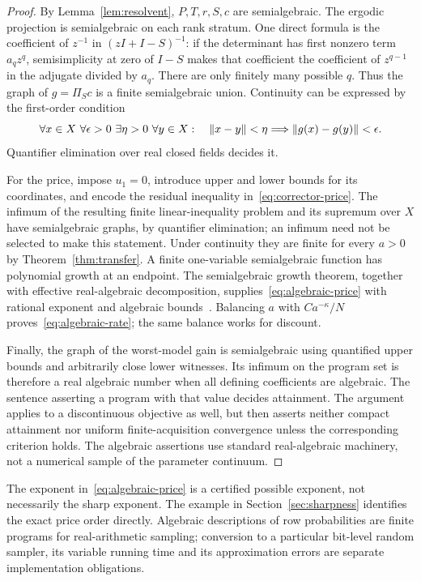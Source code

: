 \begin{proof}
By Lemma~\ref{lem:resolvent}, $P,T,r,S,c$ are semialgebraic. The ergodic projection is semialgebraic on each rank stratum. One direct formula is the coefficient of $z^{-1}$ in $(zI+I-S)^{-1}$: if the determinant has first nonzero term $a_qz^q$, semisimplicity at zero of $I-S$ makes that coefficient the coefficient of $z^{q-1}$ in the adjugate divided by $a_q$. There are only finitely many possible $q$. Thus the graph of $g=\Pi_Sc$ is a finite semialgebraic union. Continuity can be expressed by the first-order condition
\[
 \forall x\in X\ \forall\epsilon>0\ \exists\eta>0\
 \forall y\in X:\quad \norm{x-y}<\eta\Longrightarrow
 \norm{g(x)-g(y)}<\epsilon.
\]
Quantifier elimination over real closed fields decides it.

For the price, impose $u_1=0$, introduce upper and lower bounds for its coordinates, and encode the residual inequality in~\eqref{eq:corrector-price}. The infimum of the resulting finite linear-inequality problem and its supremum over $X$ have semialgebraic graphs, by quantifier elimination; an infimum need not be selected to make this statement. Under continuity they are finite for every $a>0$ by Theorem~\ref{thm:transfer}. A finite one-variable semialgebraic function has polynomial growth at an endpoint. The semialgebraic growth theorem, together with effective real-algebraic decomposition, supplies~\eqref{eq:algebraic-price} with rational exponent and algebraic bounds~\cite{BasuPollackRoy}. Balancing $a$ with $Ca^{-\kappa}/N$ proves~\eqref{eq:algebraic-rate}; the same balance works for discount.

Finally, the graph of the worst-model gain is semialgebraic using quantified upper bounds and arbitrarily close lower witnesses. Its infimum on the program set is therefore a real algebraic number when all defining coefficients are algebraic. The sentence asserting a program with that value decides attainment. The argument applies to a discontinuous objective as well, but then asserts neither compact attainment nor uniform finite-acquisition convergence unless the corresponding criterion holds. The algebraic assertions use standard real-algebraic machinery, not a numerical sample of the parameter continuum.
\end{proof}
The exponent in~\eqref{eq:algebraic-price} is a certified possible exponent, not necessarily the sharp exponent. The example in Section~\ref{sec:sharpness} identifies the exact price order directly. Algebraic descriptions of row probabilities are finite programs for real-arithmetic sampling; conversion to a particular bit-level random sampler, its variable running time and its approximation errors are separate implementation obligations.

